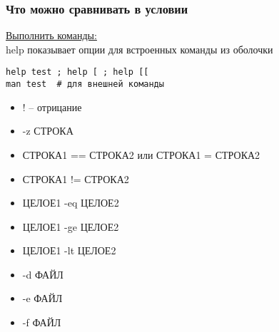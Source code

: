 \begin{frame}[fragile]
\frametitle{Что можно сравнивать в условии}

\underline{Выполнить команды:} \\
help показывает опции для встроенных команды из оболочки
	\small\begin{lstlisting}
help test ; help [ ; help [[ 
man test  # для внешней команды
\end{lstlisting}
    \pause
	\begin{itemize}
	    \item \alert{!} -- отрицание
	    \item \alert{-z} СТРОКА
	    \item СТРОКА1 \alert{==} СТРОКА2 или СТРОКА1 \alert{=} СТРОКА2
	    \item СТРОКА1 \alert{!=} СТРОКА2
	    \item ЦЕЛОЕ1 \alert{-eq} ЦЕЛОЕ2
	    \item ЦЕЛОЕ1 \alert{-ge} ЦЕЛОЕ2
	    \item ЦЕЛОЕ1 \alert{-lt} ЦЕЛОЕ2
	    \item \alert{-d} ФАЙЛ
	    \item \alert{-e} ФАЙЛ
	    \item \alert{-f} ФАЙЛ
	\end{itemize}

\end{frame}
